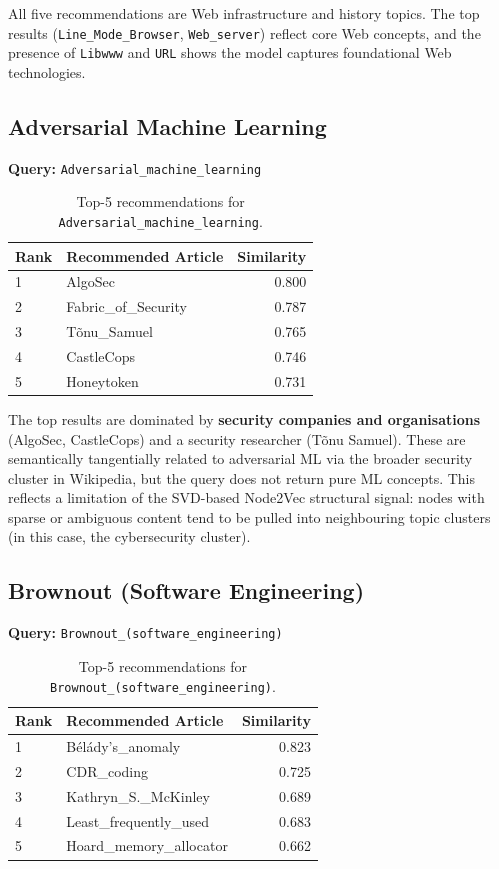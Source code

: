 \documentclass[12pt,a4paper]{article}
\begin{document}
All five recommendations are Web infrastructure and history topics.  The top
results (\texttt{Line\_Mode\_Browser}, \texttt{Web\_server}) reflect core Web
concepts, and the presence of \texttt{Libwww} and \texttt{URL} shows the model
captures foundational Web technologies.

\subsection{Adversarial Machine Learning}

\textbf{Query:} \texttt{Adversarial\_machine\_learning}

\begin{table}[H]
\centering
\caption{Top-5 recommendations for \texttt{Adversarial\_machine\_learning}.}
\label{tab:aml}
\begin{tabular}{llr}
\toprule
\textbf{Rank} & \textbf{Recommended Article} & \textbf{Similarity} \\
\midrule
1 & AlgoSec & 0.800 \\
2 & Fabric\_of\_Security & 0.787 \\
3 & Tõnu\_Samuel & 0.765 \\
4 & CastleCops & 0.746 \\
5 & Honeytoken & 0.731 \\
\bottomrule
\end{tabular}
\end{table}

The top results are dominated by \textbf{security companies and organisations}
(AlgoSec, CastleCops) and a security researcher (Tõnu Samuel).  These are
semantically tangentially related to adversarial ML via the broader security
cluster in Wikipedia, but the query does not return pure ML concepts.  This
reflects a limitation of the SVD-based Node2Vec structural signal: nodes with
sparse or ambiguous content tend to be pulled into neighbouring topic clusters
(in this case, the cybersecurity cluster).

\subsection{Brownout (Software Engineering)}

\textbf{Query:} \texttt{Brownout\_(software\_engineering)}

\begin{table}[H]
\centering
\caption{Top-5 recommendations for \texttt{Brownout\_(software\_engineering)}.}
\label{tab:brownout}
\begin{tabular}{llr}
\toprule
\textbf{Rank} & \textbf{Recommended Article} & \textbf{Similarity} \\
\midrule
1 & Bélády's\_anomaly & 0.823 \\
2 & CDR\_coding & 0.725 \\
3 & Kathryn\_S.\_McKinley & 0.689 \\
4 & Least\_frequently\_used & 0.683 \\
5 & Hoard\_memory\_allocator & 0.662 \\
\bottomrule
\end{tabular}
\end{table}
\end{document}
